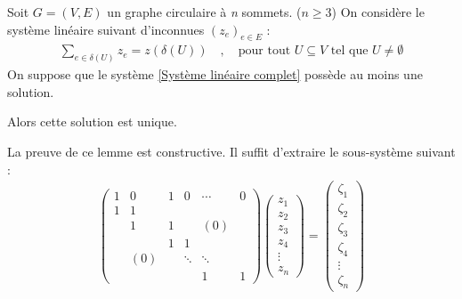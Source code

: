 \documentclass[twoside,11pt,openany,a4paper]{rapport}
\begin{document}
\begin{lem}\label{Changement de base}
Soit $G=(V,E)$ un graphe circulaire à \emph{n} sommets. ($n \ge 3$)
On considère le système linéaire suivant d'inconnues $(z_e)_{e \in E}$ :
\begin{gather}\label{Système linéaire complet}
  \sum_{e \in \delta(U)}z_e = z(\delta(U)) \quad , \quad \mbox{pour tout } U \subseteq V \mbox{ tel que } U \ne \emptyset
\end{gather}
On suppose que le système \ref{Système linéaire complet} possède au moins une solution.

Alors cette solution est unique.
\end{lem}

La preuve de ce lemme est constructive. Il suffit d'extraire le sous-système suivant :
\begin{gather}\label{Système linéaire extrait}
  \left(
  \begin{array}{cccccc}
    1 & 0   & 1 & 0      & \cdots & 0 \\
    1 & 1   &   &        &        &   \\
      & 1   & 1 &        & (0)    &   \\
      &     & 1 & 1      &        &   \\
      & (0) &   & \ddots & \ddots &   \\
      &     &   &        & 1      & 1
  \end{array} \right)
  \left(
  \begin{array}{c}
    z_1 \\
    z_2 \\
    z_3 \\
    z_4 \\
    \vdots \\
    z_n
  \end{array} \right)
  =
  \left(
  \begin{array}{c}
    \zeta_1 \\
    \zeta_2 \\
    \zeta_3 \\
    \zeta_4 \\
    \vdots  \\
    \zeta_n
  \end{array} \right)
\end{gather}
\end{document}
